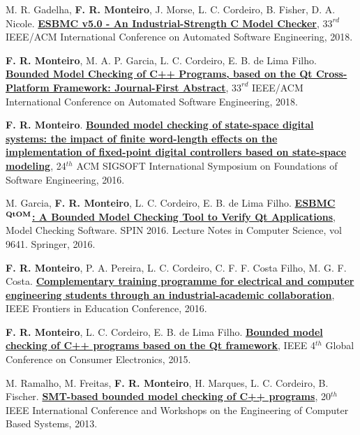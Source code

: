 \documentclass[letterpaper]{article}
\renewenvironment{itemize}{
  \begin{list}{}{
    \setlength{\leftmargin}{1.5em}
  }
}{
  \end{list}
}
\begin{document}
\begin{itemize}
    \item M. R. Gadelha, {\bf F. R. Monteiro}, J. Morse, L. C. Cordeiro, B. Fisher, D. A. Nicole. \href{https://ssvlab.github.io/lucasccordeiro/papers/ase2018.pdf}{{\bf ESBMC v5.0 - An Industrial-Strength C Model Checker}},
  $33^{rd}$ IEEE/ACM International Conference on Automated Software Engineering, 2018.  
        
    \item {\bf F. R. Monteiro}, M. A. P. Garcia, L. C. Cordeiro, E. B. de Lima Filho. \href{https://www.researchgate.net/publication/326657978_Bounded_Model_Checking_of_C_Programs_based_on_the_Qt_Cross-Platform_Framework_Journal-First_Abstract}{{\bf Bounded Model Checking of C++ Programs, based on the Qt Cross-Platform Framework: Journal-First Abstract}},
  $33^{rd}$ IEEE/ACM International Conference on Automated Software Engineering, 2018.  
  
    \item {\bf F. R. Monteiro}. \href{http://dl.acm.org/citation.cfm?id=2983979}{{\bf Bounded model checking of state-space digital systems: the impact of finite word-length effects on the implementation of fixed-point digital controllers based on state-space modeling}},
  24$^{th}$ ACM SIGSOFT International Symposium on Foundations of Software Engineering, 2016.
  
  \item M. Garcia, {\bf F. R. Monteiro}, L. C. Cordeiro, E. B. de Lima Filho. \href{http://link.springer.com/chapter/10.1007/978-3-319-32582-8_6}{{\bf ESBMC$^{\bf QtOM}$: A Bounded Model Checking Tool to Verify Qt Applications}},
  Model Checking Software. SPIN 2016. Lecture Notes in Computer Science, vol 9641. Springer, 2016.

  \item {\bf F. R. Monteiro}, P. A. Pereira, L. C. Cordeiro, C. F. F. Costa Filho, M. G. F. Costa. \href{http://ieeexplore.ieee.org/abstract/document/7757421/}{{\bf Complementary training programme for electrical and computer engineering students through an industrial-academic collaboration}},
  IEEE Frontiers in Education Conference, 2016.
  
    \item {\bf F. R. Monteiro}, L. C. Cordeiro, E. B. de Lima Filho. \href{http://ieeexplore.ieee.org/abstract/document/7398699/}{{\bf Bounded model checking of C++ programs based on the Qt framework}},
  IEEE 4$^{th}$ Global Conference on Consumer Electronics, 2015.
    
  \item M. Ramalho, M. Freitas, {\bf F. R. Monteiro}, H. Marques, L. C. Cordeiro, B. Fischer. \href{http://ieeexplore.ieee.org/abstract/document/6601583/}{{\bf SMT-based bounded model checking of C++ programs}},
  20$^{th}$ IEEE International Conference and Workshops on the Engineering of Computer Based Systems, 2013.


\end{itemize}
\end{document}
